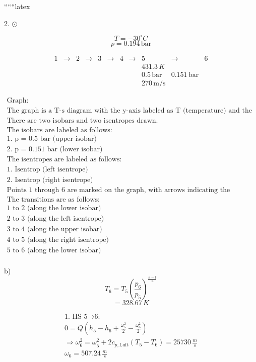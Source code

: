 
``````latex


2. \(\odot\)

\[
T = -30^\circ C
\]
\[
p = 0.194 \, \text{bar}
\]

\[
\begin{array}{cccccc}
1 & \rightarrow & 2 & \rightarrow & 3 & \rightarrow & 4 & \rightarrow & 5 & \rightarrow & 6 \\
 & & & & & & & & 431.3 \, K \\
 & & & & & & & & 0.5 \, \text{bar} & 0.151 \, \text{bar} \\
 & & & & & & & & 270 \, \text{m/s}
\end{array}
\]

\[
\begin{array}{c}
\text{Graph:} \\
\text{The graph is a T-s diagram with the y-axis labeled as T (temperature) and the x-axis labeled as s (entropy).} \\
\text{There are two isobars and two isentropes drawn.} \\
\text{The isobars are labeled as follows:} \\
\text{1. p = 0.5 bar (upper isobar)} \\
\text{2. p = 0.151 bar (lower isobar)} \\
\text{The isentropes are labeled as follows:} \\
\text{1. Isentrop (left isentrope)} \\
\text{2. Isentrop (right isentrope)} \\
\text{Points 1 through 6 are marked on the graph, with arrows indicating the transitions between these points.} \\
\text{The transitions are as follows:} \\
\text{1 to 2 (along the lower isobar)} \\
\text{2 to 3 (along the left isentrope)} \\
\text{3 to 4 (along the upper isobar)} \\
\text{4 to 5 (along the right isentrope)} \\
\text{5 to 6 (along the lower isobar)} \\
\end{array}
\]

b) 
\[
T_6 = T_5 \left( \frac{p_6}{p_5} \right)^{\frac{\kappa - 1}{\kappa}}
\]
\[
= 328.67 \, K
\]

\[
\begin{array}{l}
\text{1. HS 5} \rightarrow \text{6:} \\
0 = \dot{Q} (h_5 - h_6 + \frac{\omega_5^2}{2} - \frac{\omega_6^2}{2}) \\
\Rightarrow \omega_6^2 = \omega_5^2 + 2 c_{p, \text{Luft}} (T_5 - T_6) = 25730 \, \frac{m}{s} \\
\omega_6 = 507.24 \, \frac{m}{s}
\end{array}
\]


